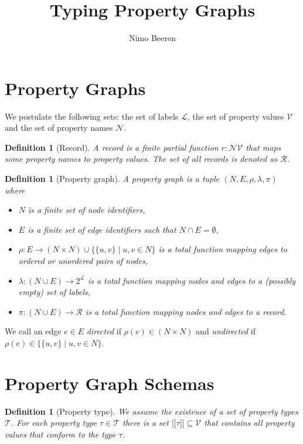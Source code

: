 \documentclass[a4paper]{article}
\title{Typing Property Graphs}
\author{Nimo Beeren}
\makeatletter
\newtheorem{definition}[theorem]{Definition}
\newcommand{\ptype}{\tau}
\newcommand{\lsem}{\ensuremath{[\![}}
\newcommand{\rsem}{\ensuremath{]\!]}}
\newcommand{\sem}[1]{\ensuremath{\lsem #1 \rsem}}
\newcommand{\pto}{}%
\DeclareRobustCommand{\pto}{\mathrel{\mathpalette\p@to@gets\to}}
\newcommand{\p@to@gets}[2]{%
  \ooalign{\hidewidth$\m@th#1\mapstochar\mkern5mu$\hidewidth\cr$\m@th#1\to$\cr}%
}
\makeatother
\begin{document}
\section{Property Graphs}

We postulate the following sets: the set of labels $\mathcal{L}$, the set of property values $\mathcal{V}$ and the set of property names $\mathcal{N}$.

\begin{definition}[Record]
  A \emph{record} is a finite partial function $r : \mathcal{N} \pto \mathcal{V}$ that maps some property names to property values. The set of all records is denoted as $\mathcal{R}$.
\end{definition}

\begin{definition}[Property graph]
  A \emph{property graph} is a tuple $(N, E, \rho, \lambda, \pi)$ where
  \begin{itemize}
    \item $N$ is a finite set of node identifiers,
    \item $E$ is a finite set of edge identifiers such that $N \cap E = \emptyset$,
    \item $\rho : E \to (N \times N) \cup \{\{u, v\} \mid u, v \in N\}$ is a total function mapping edges to ordered or unordered pairs of nodes,
    \item $\lambda : (N \cup E) \to 2^{\mathcal{L}}$ is a total function mapping nodes and edges to a (possibly empty) set of labels,
    \item $\pi : (N \cup E) \to \mathcal{R}$ is a total function mapping nodes and edges to a record.
  \end{itemize}
\end{definition}

We call an edge $e \in E$ \emph{directed} if $\rho(e) \in (N \times N)$ and \emph{undirected} if $\rho(e) \in \{\{u, v\} \mid u, v \in N\}$.

\section{Property Graph Schemas}


\begin{definition}[Property type]
  We assume the existence of a set of \emph{property types} $\mathcal{T}$. For each property type $\ptype \in \mathcal{T}$ there is a set $\sem{\ptype} \subseteq \mathcal{V}$ that contains all property values that \emph{conform} to the type $\ptype$.
\end{definition}
\end{document}
